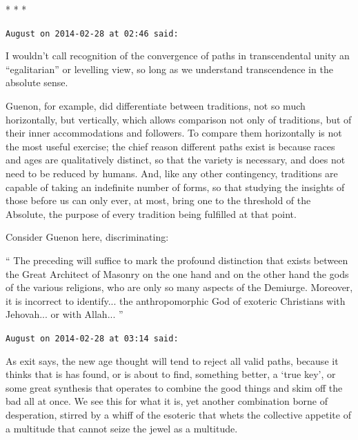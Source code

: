 
\begin{center}* * *\end{center}

\begin{footnotesize}
\begin{sffamily}

\texttt{August on 2014-02-28 at 02:46 said:}

I wouldn't call recognition of the convergence of paths in transcendental unity an ``egalitarian'' or levelling view, so long as we understand transcendence in the absolute sense.

Guenon, for example, did differentiate between traditions, not so much horizontally, but vertically, which allows comparison not only of traditions, but of their inner accommodations and followers. To compare them horizontally is not the most useful exercise; the chief reason different paths exist is because races and ages are qualitatively distinct, so that the variety is necessary, and does not need to be reduced by humans. And, like any other contingency, traditions are capable of taking an indefinite number of forms, so that studying the insights of those before us can only ever, at most, bring one to the threshold of the Absolute, the purpose of every tradition being fulfilled at that point.

Consider Guenon here, discriminating:

`` The preceding will suffice to mark the profound distinction that exists between the Great Architect of Masonry on the one hand and on the other hand the gods of the various religions, who are only so many aspects of the Demiurge. Moreover, it is incorrect to identify... the anthropomorphic God of exoteric Christians with Jehovah... or with Allah... ''

\hfill

\texttt{August on 2014-02-28 at 03:14 said:}

As exit says, the new age thought will tend to reject all valid paths, because it thinks that is has found, or is about to find, something better, a `true key', or some great synthesis that operates to combine the good things and skim off the bad all at once. We see this for what it is, yet another combination borne of desperation, stirred by a whiff of the esoteric that whets the collective appetite of a multitude that cannot seize the jewel as a multitude.


\end{sffamily}
\end{footnotesize}
